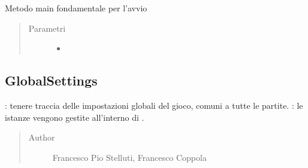 \documentclass[letterpaper,10pt,italian,openany,oneside]{sphinxmanual}
\begin{document}
\begin{fulllineitems}
\label{\detokenize{test/it/unicam/cs/pa/mastermind/gamecore/ConsoleMainManager:it.unicam.cs.pa.mastermind.gamecore.ConsoleMainManager.main(String__)}}
Metodo main fondamentale per l’avvio
\begin{quote}\begin{description}
\item[{Parametri}] \leavevmode\begin{itemize}
\item {} 
 \textendash{} 

\end{itemize}

\end{description}\end{quote}

\end{fulllineitems}



\subsection{GlobalSettings}
\label{\detokenize{test/it/unicam/cs/pa/mastermind/gamecore/GlobalSettings:globalsettings}}\label{\detokenize{test/it/unicam/cs/pa/mastermind/gamecore/GlobalSettings::doc}}

\begin{fulllineitems}
\label{\detokenize{test/it/unicam/cs/pa/mastermind/gamecore/GlobalSettings:it.unicam.cs.pa.mastermind.gamecore.GlobalSettings}}
: tenere traccia delle impostazioni globali del gioco, comuni a tutte le partite. : le istanze vengono gestite all’interno di .
\begin{quote}\begin{description}
\item[{Author}] \leavevmode
Francesco Pio Stelluti, Francesco Coppola

\end{description}\end{quote}

\end{fulllineitems}
\end{document}
